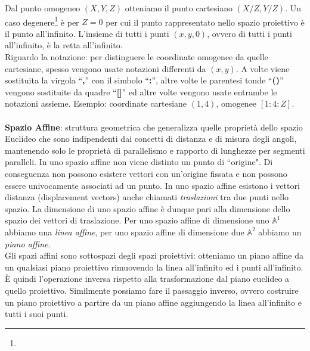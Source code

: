 \documentclass[a4paper,12pt]{tesiinfo}
\renewcommand{\footnotesize}{\fontsize{9pt}{11pt}\selectfont}
\begin{document}
Dal punto omogeneo $(X, Y, Z)$ otteniamo il punto cartesiano $(X/Z, Y/Z)$. Un caso degenere\footnote{\footnotesize{Enti/operazioni che pur rientrando sotto una data definizione (o in una data classe) presentano delle particolarit\`a che li differenziano dall'elemento generico della classe stessa, ad esempio: conica degenere, costituita da due rette; quadrica degenere, dotata di punti doppi (cono, cilindro, ecc.)}} \`e per $Z=0$ per cui il punto rappresentato nello spazio proiettivo \`e il punto all'infinito. L'insieme di tutti i punti $(x, y, 0)$, ovvero di tutti i punti all'infinito, \`e la retta all'infinito.
\\
Riguardo la notazione: per distinguere le coordinate omogenee da quelle cartesiane, spesso vengono usate notazioni differenti da $(x, y)$. A volte viene sostituita la virgola ``\textbf{,}'' con il simbolo ``\textbf{:}'', altre volte le parentesi tonde ``\textbf{()}'' vengono sostituite da quadre ``\textbf{[]}'' ed altre volte vengono usate entrambe le notazioni assieme. Esempio: coordinate cartesiane $(1, 4)$, omogenee $[1:4:Z]$.
\\\\
%
%
%
\textbf{Spazio Affine}: struttura geometrica che generalizza quelle propriet\`a dello spazio Euclideo che sono indipendenti dai concetti di distanza e di misura degli angoli, mantenendo solo le propriet\`a di parallelismo e rapporto di lunghezze per segmenti paralleli. In uno spazio affine non viene distinto un punto di ``origine". Di conseguenza non possono esistere vettori con un'origine fissata e non possono essere univocamente associati ad un punto. In uno spazio affine esistono i vettori distanza (displacement vectors) anche chiamati \textit{traslazioni} tra due punti nello spazio. La dimensione di uno spazio affine \`e dunque pari alla dimensione dello spazio dei vettori di traslazione. Per uno spazio affine di dimensione uno $\mathbb{A}^1$ abbiamo una \textit{linea affine}, per uno spazio affine di dimensione due $\mathbb{A}^2$ abbiamo un \textit{piano affine}.
\\
Gli spazi affini sono sottospazi degli spazi proiettivi: otteniamo un piano affine da un qualsiasi piano proiettivo rimuovendo la linea all'infinito ed i punti all'infinito. \`E quindi l'operazione inversa rispetto alla trasformazione dal piano euclideo a quello proiettivo. Similmente possiamo fare il passaggio inverso, ovvero costruire un piano proiettivo a partire da un piano affine aggiungendo la linea all'infinito e tutti i suoi punti.
\end{document}

